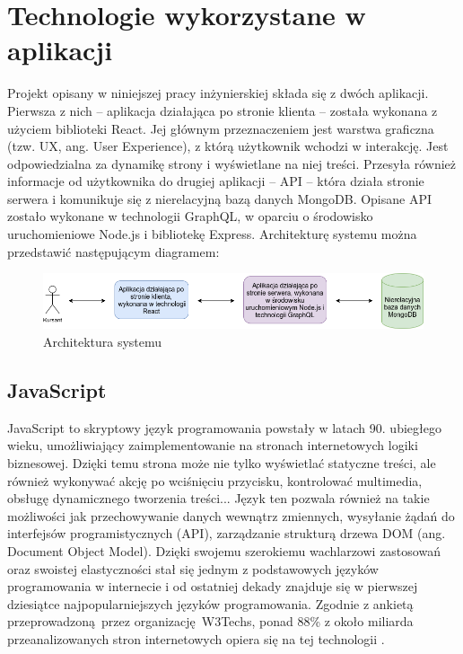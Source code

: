 \documentclass[12pt,twoside]{article}
\begin{document}
\clearpage

\section{Technologie wykorzystane w aplikacji}

Projekt opisany w niniejszej pracy inżynierskiej składa się z dwóch aplikacji. Pierwsza z nich -- aplikacja działająca po stronie klienta -- została wykonana z użyciem biblioteki React. Jej głównym przeznaczeniem jest warstwa graficzna (tzw. UX, ang. User Experience), z którą użytkownik wchodzi w interakcję. Jest odpowiedzialna za dynamikę strony i wyświetlane na niej treści. Przesyła również informacje od użytkownika do drugiej aplikacji -- API -- która działa stronie serwera i komunikuje się z nierelacyjną bazą danych MongoDB. Opisane API zostało wykonane w technologii GraphQL, w oparciu o środowisko uruchomieniowe Node.js i bibliotekę Express. Architekturę systemu można przedstawić następującym diagramem:

\begin{figure}[H]
	\centering
	\includegraphics[width=1\linewidth]{figures/app-architecture}
	\caption{Architektura systemu}
	\label{fig:system-architecture}
\end{figure}

\subsection{JavaScript}

JavaScript to skryptowy język programowania powstały w latach 90. ubiegłego wieku, umożliwiający zaimplementowanie na stronach internetowych logiki biznesowej. Dzięki temu strona może nie tylko wyświetlać statyczne treści, ale również wykonywać akcję po wciśnięciu przycisku, kontrolować multimedia, obsługę dynamicznego tworzenia treści... Język ten pozwala również na takie możliwości jak przechowywanie danych wewnątrz zmiennych, wysyłanie żądań do interfejsów programistycznych (API), zarządzanie strukturą drzewa DOM (ang. Document Object Model). Dzięki swojemu szerokiemu wachlarzowi zastosowań oraz swoistej elastyczności stał się jednym z podstawowych języków programowania w internecie i od ostatniej dekady znajduje się w pierwszej dziesiątce najpopularniejszych języków programowania. Zgodnie z ankietą przeprowadzoną przez organizację W3Techs, ponad 88\% z około miliarda przeanalizowanych stron internetowych opiera się na tej technologii \cite{JavascriptPopularity}. 
\end{document}
